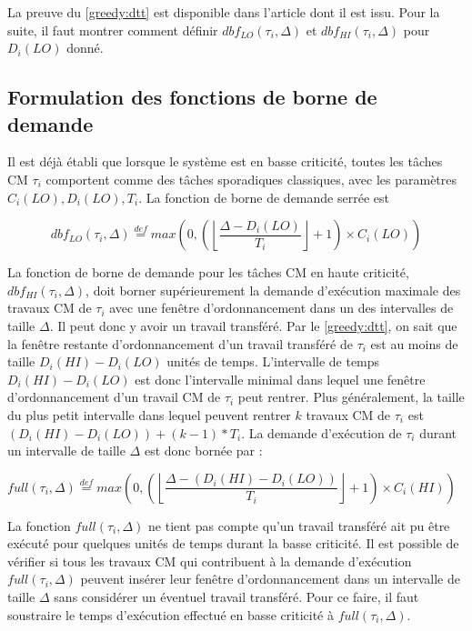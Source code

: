 \documentclass[12pt,a4paper,oneside]{book}
\theoremstyle{break}
\theoremstyle{breakplain}
\begin{document}
La preuve du \autoref{greedy:dtt} est disponible dans l'article dont il est issu. Pour la suite, il faut  montrer comment définir $dbf_{LO}(\tau_i, \Delta)$ et $dbf_{HI}(\tau_i, \Delta)$ pour $D_i(LO)$ donné.

\subsection{Formulation des fonctions de borne de demande}
Il est déjà établi que lorsque le système est en basse criticité, toutes les tâches CM $\tau_i$ comportent comme des tâches sporadiques classiques, avec les paramètres\\ $C_i(LO), D_i(LO), T_i$. La fonction de borne de demande serrée est 

\begin{equation}
dbf_{LO}(\tau_i, \Delta) \overset{def}{=} max \left( 0, \left( \left\lfloor \dfrac{\Delta-D_i(LO)}{T_i} \right\rfloor +1 \right) \times C_i(LO) \right)
\end{equation}

La fonction de borne de demande pour les tâches CM en haute criticité, $dbf_{HI}(\tau_i, \Delta)$, doit borner supérieurement la demande d'exécution maximale des travaux CM de $\tau_i$ avec une fenêtre d'ordonnancement dans un des intervalles de taille $\Delta$. Il peut donc y avoir un travail transféré. Par le \autoref{greedy:dtt}, on sait que la fenêtre restante d'ordonnancement d'un travail transféré de $\tau_i$ est au moins de taille $D_i(HI) - D_i(LO)$ unités de temps. L'intervalle de temps $D_i(HI) - D_i(LO)$ est donc l'intervalle minimal dans lequel une fenêtre d'ordonnancement d'un travail CM de $\tau_i$ peut rentrer. Plus généralement, la taille du plus petit intervalle dans lequel peuvent rentrer $k$ travaux CM de $\tau_i$ est $(D_i(HI)-D_i(LO))+(k-1)*T_i$. La demande d'exécution de $\tau_i$ durant un intervalle de taille $\Delta$ est donc bornée par :

\begin{center}
$full(\tau_i, \Delta) \overset{def}{=} max \left(0,  \left( \left\lfloor \dfrac{\Delta - (D_i(HI) - D_i(LO))}{T_i}\right\rfloor +1 \right) \times C_i(HI) \right)$
\end{center}

La fonction $full(\tau_i, \Delta)$ ne tient pas compte qu'un travail transféré ait pu être exécuté pour quelques unités de temps durant la basse criticité. Il est possible de vérifier si tous les travaux CM qui contribuent à la demande d'exécution $full(\tau_i, \Delta)$ peuvent insérer leur fenêtre d'ordonnancement dans un intervalle de taille $\Delta$ sans considérer un éventuel travail transféré. Pour ce faire, il faut soustraire le temps d'exécution effectué en basse criticité à $full(\tau_i, \Delta)$.\\
\end{document}
